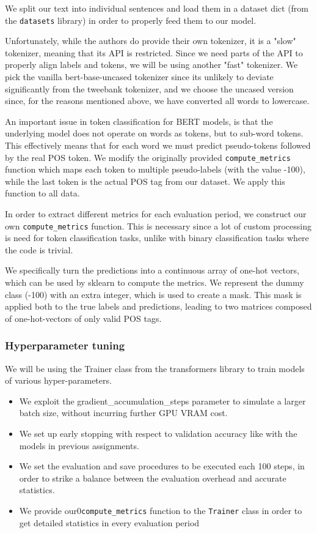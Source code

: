 \documentclass[10pt, a4paper]{article}
\def\code#1{\texttt{#1}}
\begin{document}
	We split our text into individual sentences and load them in a dataset dict (from the \code{datasets} library) in order to properly feed them to our model.
	
	Unfortunately, while the authors do provide their own tokenizer, it is a "slow" tokenizer, meaning that its API is restricted. Since we need parts of the API to properly align labels and tokens, we will be using another "fast" tokenizer. We pick the vanilla bert-base-uncased tokenizer since its unlikely to deviate significantly from the tweebank tokenizer, and we choose the uncased version since, for the reasons mentioned above, we have converted all words to lowercase.
	
	An important issue in token classification for BERT models, is that the underlying model does not operate on words as tokens, but to sub-word tokens. This effectively means that for each word we must predict pseudo-tokens followed by the real POS token. We modify the originally provided \code{compute\_metrics} function which maps each token to multiple pseudo-labels (with the value -100), while the last token is the actual POS tag from our dataset. We apply this function to all data.
	
	In order to extract different metrics for each evaluation period, we construct our own \code{compute\_metrics} function. This is necessary since a lot of custom processing is need for token classification tasks, unlike with binary classification tasks where the code is trivial.
	
	We specifically turn the predictions into a continuous array of one-hot vectors, which can be used by sklearn to compute the metrics. We represent the dummy class (-100) with an extra integer, which is used to create a mask. This mask is applied both to the true labels and predictions, leading to two matrices composed of one-hot-vectors of only valid POS tags. 
	
	
	\subsubsection{Hyperparameter tuning}
	
	We will be using the Trainer class from the transformers library to train models of various hyper-parameters.
	
	\begin{itemize}
		\item We exploit the gradient\_accumulation\_steps parameter to simulate a larger batch size, without incurring further GPU VRAM cost.
		
		\item We set up early stopping with respect to validation accuracy like with the models in previous assignments.
		
		\item We set the evaluation and save procedures to be executed each 100 steps, in order to strike a balance between the evaluation overhead and accurate statistics.
		
		\item We provide our0\code{compute\_metrics} function to the \code{Trainer} class in order to get detailed statistics in every evaluation period
	\end{itemize}
	
\end{document}
